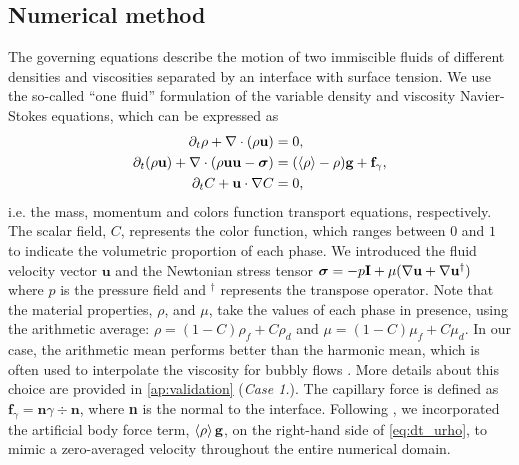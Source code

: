 \subsection{Numerical method}
The governing equations describe the motion of two immiscible fluids of different densities and viscosities separated by an interface with surface tension. 
We use the so-called ``one fluid'' formulation of the variable density and viscosity Navier-Stokes equations, which can be expressed as \citep{tryggvason2011direct}
\begin{align}
    \partial_t \rho+ \mathbf{\nabla}\cdot(\rho\textbf{u})
    &= 0,\\
    \label{eq:dt_urho}
    \partial_t (\rho \textbf{u})
    + \mathbf{\nabla}\cdot (\rho  \textbf{u} \textbf{u} - \bm\sigma)
    &= (\left<\rho\right> - \rho)\textbf{g}
    + \textbf{f}_\gamma,\\
    \label{eq:dt_C}
    \partial_t C + \textbf{u}\cdot\mathbf{\nabla} C  
    &= 0,
\end{align}
i.e. the mass, momentum and colors function transport equations, respectively. 
The scalar field, $C$, represents the color function, which ranges between $0$ and $1$ to indicate the volumetric proportion of each phase.
We introduced the fluid velocity vector $\textbf{u}$ and the Newtonian stress tensor $\bm{\sigma} = -p \textbf{I} + \mu (\mathbf{\nabla} \textbf{u}+ \mathbf{\nabla} \textbf{u}^\dagger)$ where $p$ is the pressure field and $^\dagger$ represents the transpose operator.
Note that the material properties, $\rho$, and $\mu$, take the values of each phase in presence, using the arithmetic average: $\rho = (1-C)\rho_f + C \rho_d$ and $\mu = (1-C)\mu_f + C \mu_d$. 
In our case, the arithmetic mean performs better than the harmonic mean, which is often used to interpolate the viscosity for bubbly flows \citet{hidman2023assessing,innocenti2020direct}.
More details about this choice are provided in \ref{ap:validation} (\textit{Case 1.}). 
The capillary force is defined as $\textbf{f}_\gamma =\textbf{n} \gamma \div \textbf{n} $, where \textbf{n} is the normal to the interface.
Following  \citep{bunner2002dynamics}, we incorporated the artificial body force term, $\left<\rho\right>\textbf{g}$, on the right-hand side of \ref{eq:dt_urho}, to mimic a zero-averaged velocity throughout the entire numerical domain.  

